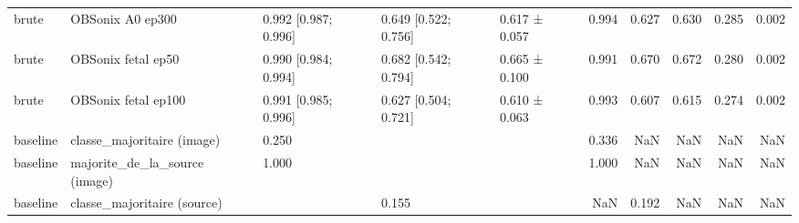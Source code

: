 \begin{tabular}{lllllrrrrr}
brute & OBSonix A0 ep300 & 0.992 [0.987; 0.996] & 0.649 [0.522; 0.756] & 0.617 ± 0.057 & 0.994 & 0.627 & 0.630 & 0.285 & 0.002 \\
brute & OBSonix fetal ep50 & 0.990 [0.984; 0.994] & 0.682 [0.542; 0.794] & 0.665 ± 0.100 & 0.991 & 0.670 & 0.672 & 0.280 & 0.002 \\
brute & OBSonix fetal ep100 & 0.991 [0.985; 0.996] & 0.627 [0.504; 0.721] & 0.610 ± 0.063 & 0.993 & 0.607 & 0.615 & 0.274 & 0.002 \\
baseline & classe_majoritaire (image) & 0.250 &  &  & 0.336 & NaN & NaN & NaN & NaN \\
baseline & majorite_de_la_source (image) & 1.000 &  &  & 1.000 & NaN & NaN & NaN & NaN \\
baseline & classe_majoritaire (source) &  & 0.155 &  & NaN & 0.192 & NaN & NaN & NaN \\
\bottomrule
\end{tabular}
